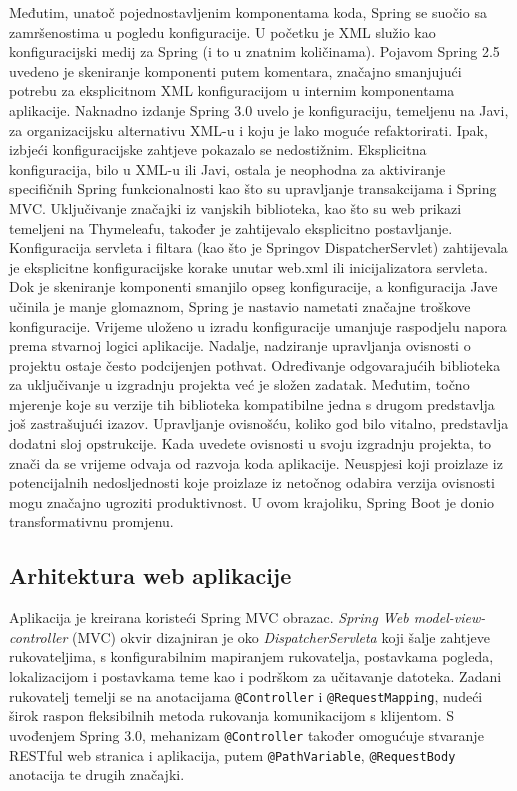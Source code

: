 \documentclass[a4paper,12pt,oneside]{article}
\begin{document}
Međutim, unatoč pojednostavljenim komponentama koda, Spring se suočio sa zamršenostima u pogledu konfiguracije. U početku je XML služio kao konfiguracijski medij za Spring (i to u znatnim količinama). Pojavom Spring 2.5 uvedeno je skeniranje komponenti putem komentara, značajno smanjujući potrebu za eksplicitnom XML konfiguracijom u internim komponentama aplikacije. Naknadno izdanje Spring 3.0 uvelo je konfiguraciju, temeljenu na Javi, za organizacijsku alternativu XML-u i koju je lako moguće refaktorirati.
Ipak, izbjeći konfiguracijske zahtjeve pokazalo se nedostižnim. Eksplicitna konfiguracija, bilo u XML-u ili Javi, ostala je neophodna za aktiviranje specifičnih Spring funkcionalnosti kao što su upravljanje transakcijama i Spring MVC. Uključivanje značajki iz vanjskih biblioteka, kao što su web prikazi temeljeni na Thymeleafu, također je zahtijevalo eksplicitno postavljanje. Konfiguracija servleta i filtara (kao što je Springov DispatcherServlet) zahtijevala je eksplicitne konfiguracijske korake unutar web.xml ili inicijalizatora servleta. Dok je skeniranje komponenti smanjilo opseg konfiguracije, a konfiguracija Jave učinila je manje glomaznom, Spring je nastavio nametati značajne troškove konfiguracije. Vrijeme uloženo u izradu konfiguracije umanjuje raspodjelu napora prema stvarnoj logici aplikacije. Nadalje, nadziranje upravljanja ovisnosti o projektu ostaje često podcijenjen pothvat. Određivanje odgovarajućih biblioteka za uključivanje u izgradnju projekta već je složen zadatak. Međutim, točno mjerenje koje su verzije tih biblioteka kompatibilne jedna s drugom predstavlja još zastrašujući izazov. Upravljanje ovisnošću, koliko god bilo vitalno, predstavlja dodatni sloj opstrukcije. Kada uvedete ovisnosti u svoju izgradnju projekta, to znači da se vrijeme odvaja od razvoja koda aplikacije. Neuspjesi koji proizlaze iz potencijalnih nedosljednosti koje proizlaze iz netočnog odabira verzija ovisnosti mogu značajno ugroziti produktivnost. U ovom krajoliku, Spring Boot je donio transformativnu promjenu.\cite{springBootInAction}

\subsection{Arhitektura web aplikacije}

Aplikacija je kreirana koristeći Spring MVC obrazac. \textit{Spring Web model-view-controller} (MVC) okvir dizajniran je oko \textit{DispatcherServleta} koji šalje zahtjeve rukovateljima, s konfigurabilnim mapiranjem rukovatelja, postavkama pogleda, lokalizacijom i postavkama teme kao i podrškom za učitavanje datoteka. Zadani rukovatelj temelji se na anotacijama \texttt{@Controller} i \texttt{@RequestMapping}, nudeći širok raspon fleksibilnih metoda rukovanja komunikacijom s klijentom. S uvođenjem Spring 3.0, mehanizam \texttt{@Controller} također omogućuje stvaranje RESTful web stranica i aplikacija, putem \texttt{@PathVariable}, \texttt{@RequestBody} anotacija te drugih značajki.\cite{spring-mvc-url} 
\end{document}
